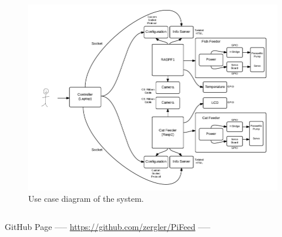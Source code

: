 \documentclass[final]{beamer}
\newlength{\onecolwid}
\newlength{\twocolwid}
\begin{document}
\begin{frame}[t]
\begin{columns}[t]
\begin{column}{\twocolwid}
\begin{columns}[t,totalwidth=\twocolwid]
\begin{column}{\onecolwid}
\begin{figure}
\includegraphics[width=1\linewidth]{UseCaseDiagram}
\caption{Use case diagram of the system.}
\end{figure}



\end{column} %

\end{columns} %


\begin{alertblock}{GitHub Page}
    \centering
----- \url{https://github.com/zergler/PiFeed} -----

\end{alertblock} 


\begin{columns}[t,totalwidth=\twocolwid] %

\begin{column}{\onecolwid} %



\end{column}
\end{columns}
\end{column}
\end{columns}
\end{frame}
\end{document}
